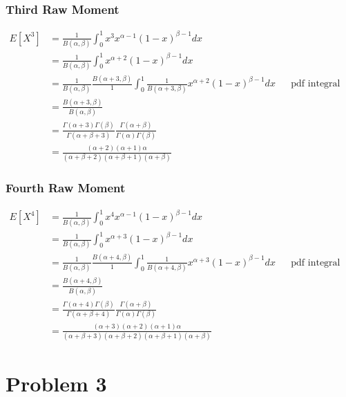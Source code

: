 \documentclass[12pt]{article}
\begin{document}
\subsubsection*{Third Raw Moment}
\begin{align*}
        E[X^3] &= \frac{1}{B(\alpha,\beta)} \int_0^1 x^3 x^{\alpha-1} (1-x)^{\beta-1}dx \\
        &= \frac{1}{B(\alpha,\beta)} \int_0^1 x^{\alpha+2} (1-x)^{\beta-1}dx \\
        &= \frac{1}{B(\alpha,\beta)}\frac{B(\alpha+3,\beta)}{1}
          \int_0^1 \frac{1}{B(\alpha+3,\beta)} x^{\alpha+2} (1-x)^{\beta-1}dx & &
          \textrm{pdf integral evaluates to 1} \\
        &= \frac{B(\alpha+3,\beta)}{B(\alpha,\beta)} \\
        &= \frac{\Gamma(\alpha+3)\Gamma(\beta)}{\Gamma(\alpha+\beta+3)}
           \frac{\Gamma(\alpha+\beta)}{\Gamma(\alpha)\Gamma(\beta)} \\
        &= \frac{(\alpha+2)(\alpha+1)\alpha}{(\alpha+\beta+2)(\alpha+\beta+1)(\alpha+\beta)}
\end{align*}

\subsubsection*{Fourth Raw Moment}
\begin{align*}
        E[X^4] &= \frac{1}{B(\alpha,\beta)} \int_0^1 x^4 x^{\alpha-1} (1-x)^{\beta-1}dx \\
        &= \frac{1}{B(\alpha,\beta)} \int_0^1 x^{\alpha+3} (1-x)^{\beta-1}dx \\
        &= \frac{1}{B(\alpha,\beta)}\frac{B(\alpha+4,\beta)}{1}
          \int_0^1 \frac{1}{B(\alpha+4,\beta)} x^{\alpha+3} (1-x)^{\beta-1}dx & &
          \textrm{pdf integral evaluates to 1} \\
        &= \frac{B(\alpha+4,\beta)}{B(\alpha,\beta)} \\
        &= \frac{\Gamma(\alpha+4)\Gamma(\beta)}{\Gamma(\alpha+\beta+4)}
           \frac{\Gamma(\alpha+\beta)}{\Gamma(\alpha)\Gamma(\beta)} \\
        &= \frac{(\alpha+3)(\alpha+2)(\alpha+1)\alpha}
        {(\alpha+\beta+3)(\alpha+\beta+2)(\alpha+\beta+1)(\alpha+\beta)}
\end{align*}

\section*{Problem 3}
\end{document}
